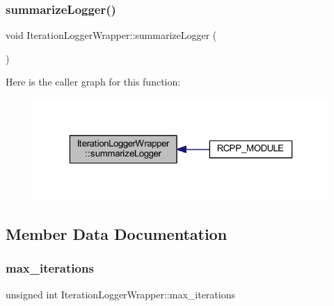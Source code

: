 \subsubsection{\texorpdfstring{summarize\+Logger()}{summarizeLogger()}}
{\footnotesize\ttfamily void Iteration\+Logger\+Wrapper\+::summarize\+Logger (\begin{DoxyParamCaption}{ }\end{DoxyParamCaption})\hspace{0.3cm}{\ttfamily [inline]}}

Here is the caller graph for this function\+:\nopagebreak
\begin{figure}[H]
\begin{center}
\leavevmode
\includegraphics[width=323pt]{class_iteration_logger_wrapper_a8b5276c1c6bea1ee5fceac5d4b03acee_icgraph}
\end{center}
\end{figure}


\subsection{Member Data Documentation}
\mbox{\label{class_iteration_logger_wrapper_a558ed3722fe17ab31c6463e8dbda7ccc}} 
\subsubsection{\texorpdfstring{max\+\_\+iterations}{max\_iterations}}
{\footnotesize\ttfamily unsigned int Iteration\+Logger\+Wrapper\+::max\+\_\+iterations\hspace{0.3cm}{\ttfamily [private]}}

\mbox{\label{class_iteration_logger_wrapper_ae3ae6a45a08aeb251ad15282ebc6794d}} 
